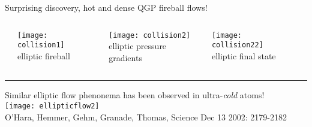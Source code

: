 \documentclass[svgnames]{beamer}
\begin{document}
\begin{frame}[t]{Surprising discovery, hot and dense QGP fireball flows!}
\vspace{0.1 in}
\begin{columns}
 \begin{column}{0.05\textwidth}
 \end{column}

 \begin{column}{0.3\textwidth}
  \centering
  \texttt{[image: collision1]} \\
  \footnotesize elliptic fireball
 \end{column}
 
 \begin{column}{0.3\textwidth}
 \centering
  \hspace{0.15 in}
  \texttt{[image: collision2]} \\
  \footnotesize elliptic pressure gradients
 \end{column}
 
 \begin{column}{0.3\textwidth}
  \centering
  \texttt{[image: collision22]} \\
  \footnotesize elliptic final state
 \end{column}
 
 \begin{column}{0.05\textwidth}
 \end{column}
\end{columns}

\vspace{0.2 in}
\hrule
\vspace{0.2 in}

\centering
Similar elliptic flow phenonema has been observed in ultra-\emph{cold} atoms! \\
\vspace{0.05 in}
\texttt{[image: ellipticflow2]} \\
\vspace{0.05 in}
\footnotesize O'Hara, Hemmer, Gehm, Granade, Thomas, Science Dec 13 2002: 2179-2182 

\end{frame}
\end{document}

